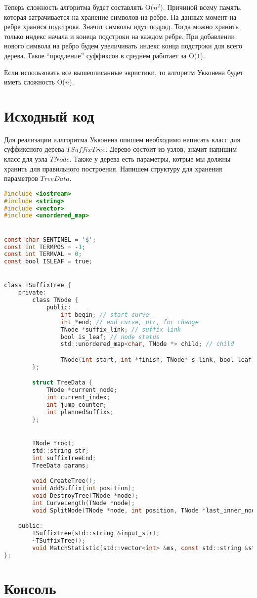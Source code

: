Теперь сложность алгоритма будет составлять O($n^2$). Причиной всему память, которая затрачивается на хранение символов на ребре.
На данных момент на ребре хранися подстрока. Значит символы идут подряд. Тогда можно хранить только индекс начала 
и конеца подстроки на каждом ребре. При добавлении нового символа на ребро будем увеличивать индекс конца подстроки для всего дерева.
Такое \enquote{продление} суффиксов в среднем работает за O($1$).

Если использовать все вышеописанные эвристики, то алгоритм Укконена будет иметь сложность O($n$).


\pagebreak

\section{Исходный код}
Для реализации аллгоритма Укконена опишем необходимо написать класс для суффиксного дерева $TSuffixTree$. Дерево состоит из узлов, 
значит напишим класс для узла $TNode$. Также у дерева есть параметры, котрые мы должны хранить для правильного построения.
Напишем структуру для хранения параметров $TreeData$. 



\begin{lstlisting}[language=C]
#include <iostream>
#include <string>
#include <vector>
#include <unordered_map>


const char SENTINEL = '$';
const int TERMPOS = -1;
const int TERMVAL = 0;
const bool ISLEAF = true;


class TSuffixTree {
    private:
        class TNode {
            public:
                int begin; // start curve
                int *end; // end curve, ptr, for change
                TNode *suffix_link; // suffix link
                bool is_leaf; // node status
                std::unordered_map<char, TNode *> child; // child

                TNode(int start, int *finish, TNode* s_link, bool leaf); // node constructor
        };

        struct TreeData {
            TNode *current_node; 
            int current_index;
            int jump_counter;
            int plannedSuffixs;
        };


        TNode *root; 
        std::string str; 
        int suffixTreeEnd;
        TreeData params; 

        void CreateTree();
        void AddSuffix(int position); 
        void DestroyTree(TNode *node);
        int CurveLength(TNode *node);
        void SplitNode(TNode *node, int position, TNode *last_inner_node);

    public:
        TSuffixTree(std::string &input_str);
        ~TSuffixTree();
        void MatchStatistic(std::vector<int> &ms, const std::string &str); 
};
\end{lstlisting}

\pagebreak

\section{Консоль}
\begin{alltt}

\end{alltt}
\pagebreak
